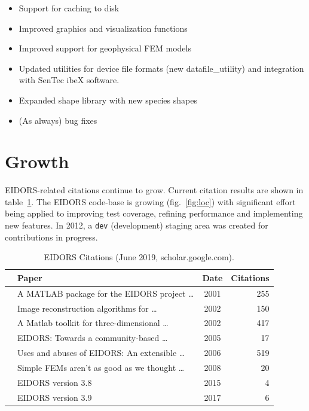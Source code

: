 \documentclass[10pt,letterpaper]{article}
\begin{document}
\begin{multicols}{2}
\begin{itemize}
\item Support for caching to disk

\item Improved graphics and visualization functions

\item Improved support for geophysical FEM models

\item Updated utilities for device file formats 
      (new datafile\_utility) and integration with
      SenTec ibeX software.

\item Expanded shape library with new species shapes

\item (As always) bug fixes 
\end{itemize}

\section{Growth}
EIDORS-related citations continue to grow. Current citation results are
shown in table~\ref{tbl:cite}.
%
The EIDORS code-base is growing
(fig.~\ref{fig:loc})
 with significant effort being applied to
improving test coverage, refining performance and implementing new features.
 In 2012, a {\tt dev} (development) staging area was created for
contributions in progress.

\begin{table}[H]
  \footnotesize
\centering
\caption{\label{tbl:cite} EIDORS Citations
 (June 2019, scholar.google.com).
}
\begin{tabular}{r@{\hspace{1mm}}lcr}
  \toprule
  & Paper & Date & \hspace{-2mm}Citations \\
  \midrule
  \cite{vauhkonen2001} & A MATLAB package for the EIDORS project \ldots\hspace{-5mm}  
    & 2001 & 255 \\
  \cite{polydorides2002phd} & Image reconstruction algorithms for \ldots
    & 2002 & 150 \\
  \cite{polydorides2002matlab} & A Matlab toolkit for three-dimensional \ldots
    & 2002 & 417 \\
  \cite{adler2005} & EIDORS: Towards a community-based \ldots
    & 2005 & 17 \\
  \cite{adler2006} & Uses and abuses of {EIDORS}: An extensible \ldots
    & 2006 & 519 \\
  \cite{adler2008} & Simple FEMs aren't as good as we thought \ldots
    & 2008 &  20 \\
  \cite{adler2015} & EIDORS version 3.8
    & 2015 & 4 \\
  \cite{adler2017} & EIDORS version 3.9
    & 2017 & 6 \\
  \bottomrule
\end{tabular}
\vspace{-1em}
\end{table}


\end{multicols}
\end{document}
